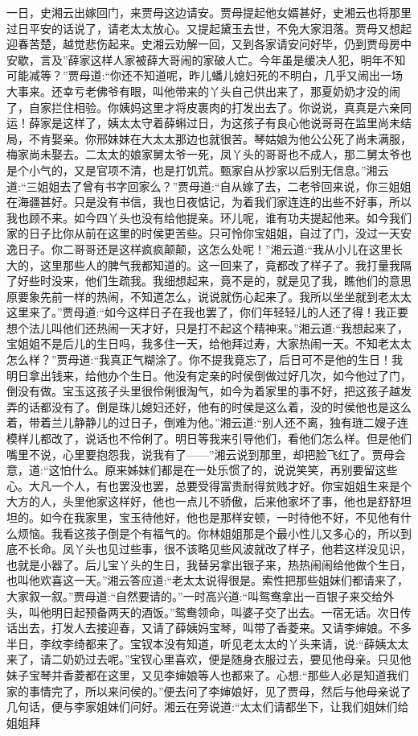 \begin{parag}
    一日，史湘云出嫁回门，来贾母这边请安。贾母提起他女婿甚好，史湘云也将那里过日平安的话说了，请老太太放心。又提起黛玉去世，不免大家泪落。贾母又想起迎春苦楚，越觉悲伤起来。史湘云劝解一回，又到各家请安问好毕，仍到贾母房中安歇，言及”薛家这样人家被薛大哥闹的家破人亡。今年虽是缓决人犯，明年不知可能减等？”贾母道:“你还不知道呢，昨儿蟠儿媳妇死的不明白，几乎又闹出一场大事来。还幸亏老佛爷有眼，叫他带来的丫头自己供出来了，那夏奶奶才没的闹了，自家拦住相验。你姨妈这里才将皮裹肉的打发出去了。你说说，真真是六亲同运！薛家是这样了，姨太太守着薛蝌过日，为这孩子有良心他说哥哥在监里尚未结局，不肯娶亲。你邢妹妹在大太太那边也就很苦。琴姑娘为他公公死了尚未满服，梅家尚未娶去。二太太的娘家舅太爷一死，凤丫头的哥哥也不成人，那二舅太爷也是个小气的，又是官项不清，也是打饥荒。甄家自从抄家以后别无信息。”湘云道:“三姐姐去了曾有书字回家么？”贾母道:“自从嫁了去，二老爷回来说，你三姐姐在海疆甚好。只是没有书信，我也日夜惦记，为着我们家连连的出些不好事，所以我也顾不来。如今四丫头也没有给他提亲。环儿呢，谁有功夫提起他来。如今我们家的日子比你从前在这里的时侯更苦些。只可怜你宝姐姐，自过了门，没过一天安逸日子。你二哥哥还是这样疯疯颠颠，这怎么处呢！”湘云道:“我从小儿在这里长大的，这里那些人的脾气我都知道的。这一回来了，竟都改了样子了。我打量我隔了好些时没来，他们生疏我。我细想起来，竟不是的，就是见了我，瞧他们的意思原要象先前一样的热闹，不知道怎么，说说就伤心起来了。我所以坐坐就到老太太这里来了。”贾母道:“如今这样日子在我也罢了，你们年轻轻儿的人还了得！我正要想个法儿叫他们还热闹一天才好，只是打不起这个精神来。”湘云道:“我想起来了，宝姐姐不是后儿的生日吗，我多住一天，给他拜过寿，大家热闹一天。不知老太太怎么样？”贾母道:“我真正气糊涂了。你不提我竟忘了，后日可不是他的生日！我明日拿出钱来，给他办个生日。他没有定亲的时侯倒做过好几次，如今他过了门，倒没有做。宝玉这孩子头里很伶俐很淘气，如今为着家里的事不好，把这孩子越发弄的话都没有了。倒是珠儿媳妇还好，他有的时侯是这么着，没的时侯他也是这么着，带着兰儿静静儿的过日子，倒难为他。”湘云道:“别人还不离，独有琏二嫂子连模样儿都改了，说话也不伶俐了。明日等我来引导他们，看他们怎么样。但是他们嘴里不说，心里要抱怨我，说我有了——”湘云说到那里，却把脸飞红了。贾母会意，道:“这怕什么。原来姊妹们都是在一处乐惯了的，说说笑笑，再别要留这些心。大凡一个人，有也罢没也罢，总要受得富贵耐得贫贱才好。你宝姐姐生来是个大方的人，头里他家这样好，他也一点儿不骄傲，后来他家坏了事，他也是舒舒坦坦的。如今在我家里，宝玉待他好，他也是那样安顿，一时待他不好，不见他有什么烦恼。我看这孩子倒是个有福气的。你林姐姐那是个最小性儿又多心的，所以到底不长命。凤丫头也见过些事，很不该略见些风波就改了样子，他若这样没见识，也就是小器了。后儿宝丫头的生日，我替另拿出银子来，热热闹闹给他做个生日，也叫他欢喜这一天。”湘云答应道:“老太太说得很是。索性把那些姐妹们都请来了，大家叙一叙。”贾母道:“自然要请的。”一时高兴道:“叫鸳鸯拿出一百银子来交给外头，叫他明日起预备两天的酒饭。”鸳鸯领命，叫婆子交了出去。一宿无话。次日传话出去，打发人去接迎春，又请了薛姨妈宝琴，叫带了香菱来。又请李婶娘。不多半日，李纹李绮都来了。宝钗本没有知道，听见老太太的丫头来请，说:“薛姨太太来了，请二奶奶过去呢。”宝钗心里喜欢，便是随身衣服过去，要见他母亲。只见他妹子宝琴并香菱都在这里，又见李婶娘等人也都来了。心想:“那些人必是知道我们家的事情完了，所以来问侯的。”便去问了李婶娘好，见了贾母，然后与他母亲说了几句话，便与李家姐妹们问好。湘云在旁说道:“太太们请都坐下，让我们姐妹们给姐姐拜
\end{parag}
